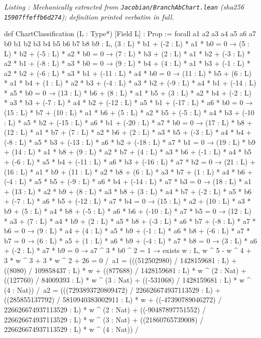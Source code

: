 \documentclass[a4paper,11pt]{article}
\newcounter{leanlisting}
\newenvironment{leanlisting}[2]{%
  \refstepcounter{leanlisting}\label{#2}%
  \begin{center}\textit{\small Listing \theleanlisting: #1}\end{center}%
  \Verbatim[breaklines=true,breakanywhere=true,fontsize=\footnotesize,frame=single,framesep=4pt,rulecolor=\color{gray!50},fillcolor=\color{gray!5}]%
}{%
  \endVerbatim%
}
\theoremstyle{plain}
\theoremstyle{definition}
\theoremstyle{remark}
\begin{document}
\begin{leanlisting}{Mechanically extracted from \texttt{Jacobian/BranchAbChart.lean} (sha256 \texttt{15907ffeffb6d274}); definition printed verbatim in full.}{ab:lst:def-chartclass}
def ChartClassification (L : Type*) [Field L] : Prop :=
  forall a1 a2 a3 a4 a5 a6 a7 b0 b1 b2 b3 b4 b5 b6 b7 b8 b9 : L,
    (3 : L) * b1 + (-2 : L) * a1 * b0 = 0 →
    (5 : L) * b2 + (-5 : L) * a2 * b0 = 0 →
    (7 : L) * b3 + (2 : L) * a1 * b2 + (-3 : L) * a2 * b1 + (-8 : L) * a3 * b0 = 0 →
    (9 : L) * b4 + (4 : L) * a1 * b3 + (-1 : L) * a2 * b2 + (-6 : L) * a3 * b1 + (-11 : L) * a4 * b0 = 0 →
    (11 : L) * b5 + (6 : L) * a1 * b4 + (1 : L) * a2 * b3 + (-4 : L) * a3 * b2 + (-9 : L) * a4 * b1 + (-14 : L) * a5 * b0 = 0 →
    (13 : L) * b6 + (8 : L) * a1 * b5 + (3 : L) * a2 * b4 + (-2 : L) * a3 * b3 + (-7 : L) * a4 * b2 + (-12 : L) * a5 * b1 + (-17 : L) * a6 * b0 = 0 →
    (15 : L) * b7 + (10 : L) * a1 * b6 + (5 : L) * a2 * b5 + (-5 : L) * a4 * b3 + (-10 : L) * a5 * b2 + (-15 : L) * a6 * b1 + (-20 : L) * a7 * b0 = 0 →
    (17 : L) * b8 + (12 : L) * a1 * b7 + (7 : L) * a2 * b6 + (2 : L) * a3 * b5 + (-3 : L) * a4 * b4 + (-8 : L) * a5 * b3 + (-13 : L) * a6 * b2 + (-18 : L) * a7 * b1 = 0 →
    (19 : L) * b9 + (14 : L) * a1 * b8 + (9 : L) * a2 * b7 + (4 : L) * a3 * b6 + (-1 : L) * a4 * b5 + (-6 : L) * a5 * b4 + (-11 : L) * a6 * b3 + (-16 : L) * a7 * b2 = 0 →
    (21 : L) + (16 : L) * a1 * b9 + (11 : L) * a2 * b8 + (6 : L) * a3 * b7 + (1 : L) * a4 * b6 + (-4 : L) * a5 * b5 + (-9 : L) * a6 * b4 + (-14 : L) * a7 * b3 = 0 →
    (18 : L) * a1 + (13 : L) * a2 * b9 + (8 : L) * a3 * b8 + (3 : L) * a4 * b7 + (-2 : L) * a5 * b6 + (-7 : L) * a6 * b5 + (-12 : L) * a7 * b4 = 0 →
    (15 : L) * a2 + (10 : L) * a3 * b9 + (5 : L) * a4 * b8 + (-5 : L) * a6 * b6 + (-10 : L) * a7 * b5 = 0 →
    (12 : L) * a3 + (7 : L) * a4 * b9 + (2 : L) * a5 * b8 + (-3 : L) * a6 * b7 + (-8 : L) * a7 * b6 = 0 →
    (9 : L) * a4 + (4 : L) * a5 * b9 + (-1 : L) * a6 * b8 + (-6 : L) * a7 * b7 = 0 →
    (6 : L) * a5 + (1 : L) * a6 * b9 + (-4 : L) * a7 * b8 = 0 →
    (3 : L) * a6 + (-2 : L) * a7 * b9 = 0 →
    a7 ^ 3 * b0 ^ 2 = 1 →
    exists w : L, w ^ 5 - w ^ 4 + 3 * w ^ 3 + 3 * w ^ 2 + 26 = 0 /\
      a1 = (((512502980) / 1428159681 : L) + ((8080) / 109858437 : L) * w + ((877688) / 1428159681 : L) * w ^ (2 : Nat) + ((127760) / 84009393 : L) * w ^ (3 : Nat) + ((-531068) / 1428159681 : L) * w ^ (4 : Nat)) /\
      a2 = (((7293893720809472) / 226626674937113529 : L) + ((285855137792) / 5810940383002911 : L) * w + ((-47390789046272) / 226626674937113529 : L) * w ^ (2 : Nat) + ((-90487897751552) / 226626674937113529 : L) * w ^ (3 : Nat) + ((21860765739008) / 226626674937113529 : L) * w ^ (4 : Nat)) /\

\end{leanlisting}
\end{document}
